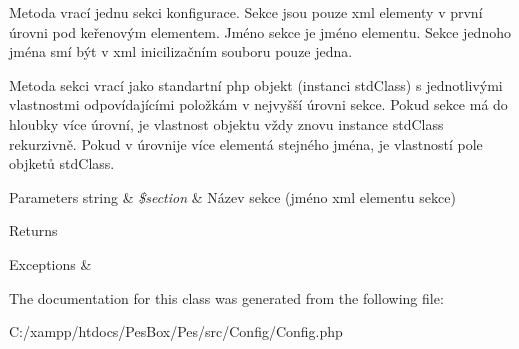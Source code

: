 Metoda vrací jednu sekci konfigurace. Sekce jsou pouze xml elementy v první úrovni pod keřenovým elementem. Jméno sekce je jméno elementu. Sekce jednoho jména smí být v xml inicilizačním souboru pouze jedna.

Metoda sekci vrací jako standartní php objekt (instanci std\+Class) s jednotlivými vlastnostmi odpovídajícími položkám v nejvyšší úrovni sekce. Pokud sekce má do hloubky více úrovní, je vlastnost objektu vždy znovu instance std\+Class rekurzivně. Pokud v úrovnije více elementá stejného jména, je vlastností pole objketů std\+Class.


\begin{DoxyParams}[1]{Parameters}
string & {\em \$section} & Název sekce (jméno xml elementu sekce) \\
\hline
\end{DoxyParams}
\begin{DoxyReturn}{Returns}

\end{DoxyReturn}

\begin{DoxyExceptions}{Exceptions}
{\em } & \\
\hline
\end{DoxyExceptions}


The documentation for this class was generated from the following file\+:\begin{DoxyCompactItemize}
\item 
C\+:/xampp/htdocs/\+Pes\+Box/\+Pes/src/\+Config/Config.\+php\end{DoxyCompactItemize}
